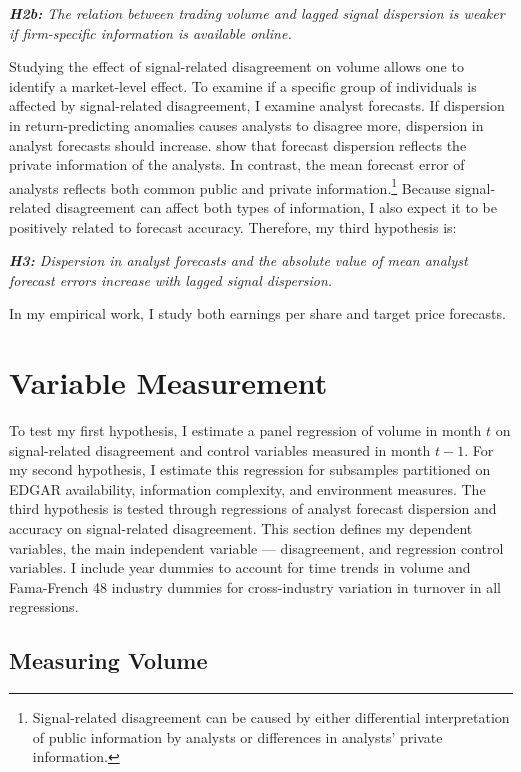 \documentclass[
  12pt,
  a4paper,
  twoside,
  onecolumn]{article}
\begin{document}
\textit{\textbf{H2b:} The relation between trading volume and lagged signal dispersion is weaker if firm-specific information is available online.}

Studying the effect of signal-related disagreement on volume allows one
to identify a market-level effect. To examine if a specific group of
individuals is affected by signal-related disagreement, I examine
analyst forecasts. If dispersion in return-predicting anomalies causes
analysts to disagree more, dispersion in analyst forecasts should
increase. \cite{barron_etal1998} show that forecast dispersion reflects
the private information of the analysts. In contrast, the mean forecast
error of analysts reflects both common public and private
information.\footnote{Signal-related disagreement can be caused by
  either differential interpretation of public information by analysts
  or differences in analysts' private information.} Because
signal-related disagreement can affect both types of information, I also
expect it to be positively related to forecast accuracy. Therefore, my
third hypothesis is:

\textit{\textbf{H3:} Dispersion in analyst forecasts and the absolute value of mean analyst forecast errors increase with lagged signal dispersion.}

In my empirical work, I study both earnings per share and target price
forecasts.

\hypertarget{sec:measure}{%
\section{Variable Measurement}\label{sec:measure}}

To test my first hypothesis, I estimate a panel regression of volume in
month \(t\) on signal-related disagreement and control variables
measured in month \(t-1\). For my second hypothesis, I estimate this
regression for subsamples partitioned on EDGAR availability, information
complexity, and environment measures. The third hypothesis is tested
through regressions of analyst forecast dispersion and accuracy on
signal-related disagreement. This section defines my dependent
variables, the main independent variable --- disagreement, and
regression control variables. I include year dummies to account for time
trends in volume and Fama-French 48 industry dummies for cross-industry
variation in turnover in all regressions.

\hypertarget{sec:measuring_volume}{%
\subsection{Measuring Volume}\label{sec:measuring_volume}}
\end{document}

